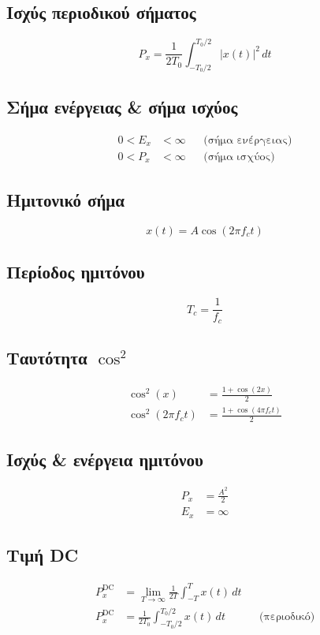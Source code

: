 \documentclass[11pt,a4paper]{article}
\begin{document}
\subsection{Ισχύς περιοδικού σήματος}
\begin{equation}
P_x = \frac{1}{2T_0} \int_{-T_0/2}^{T_0/2} |x(t)|^2\,dt
\end{equation}

\subsection{Σήμα ενέργειας \& σήμα ισχύος}
\begin{align}
0 < E_x &< \infty && \text{(σήμα ενέργειας)} \\
0 < P_x &< \infty && \text{(σήμα ισχύος)}
\end{align}

\subsection{Ημιτονικό σήμα}
\begin{equation}
x(t) = A\cos(2\pi f_c t)
\end{equation}

\subsection{Περίοδος ημιτόνου}
\begin{equation}
T_c = \frac{1}{f_c}
\end{equation}

\subsection{Ταυτότητα $\cos^2$}
\begin{align}
\cos^2(x) &= \frac{1 + \cos(2x)}{2} \\
\cos^2(2\pi f_c t) &= \frac{1 + \cos(4\pi f_c t)}{2}
\end{align}

\subsection{Ισχύς \& ενέργεια ημιτόνου}
\begin{align}
P_x &= \frac{A^2}{2} \\
E_x &= \infty
\end{align}

\subsection{Τιμή DC}
\begin{align}
P_x^{\mathrm{DC}} &= \lim_{T\to\infty} \frac{1}{2T} \int_{-T}^{T} x(t)\,dt \\
P_x^{\mathrm{DC}} &= \frac{1}{2T_0} \int_{-T_0/2}^{T_0/2} x(t)\,dt && \text{(περιοδικό)}
\end{align}
\end{document}
